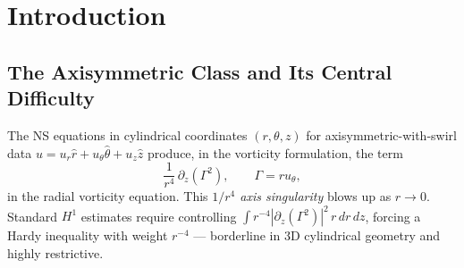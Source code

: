 \documentclass[11pt]{article}
\newcommand{\eps}{\varepsilon}
\begin{document}
\vspace{6pt}

\begin{abstract}
We study the 3D incompressible Navier--Stokes equations for
axisymmetric-with-swirl data. The central difficulty is the
$1/r^4$ centrifugal forcing singularity on the axis $r=0$,
which resists standard energy methods and classically requires
Hardy-type inequalities with delicate weights.

We introduce the \emph{Phi-Renormalization} (Definition~\ref{def:phi}): the substitution
$\Gamma = ru_\theta$, $\Phi = \Gamma/r^2 = u_\theta/r$
transforms the singular term via the algebraic identity
\[
  \frac{1}{r^4}\,\partial_z(\Gamma^2) = \partial_z(\Phi^2),
\]
canceling the $1/r^4$ singularity \emph{exactly and algebraically},
with no Hardy inequality and no approximation.

Two results follow: (I) global $C^\infty$ regularity for the
$Q_1$-augmented system at any $\eps>0$; (II) Gronwall-free convergence
$u^\eps\to u$ at rate $O(\eps^{4/(\beta+2)})$ via a multi-component
stability energy tracking vorticity direction, swirl, and axial vorticity
simultaneously.

\medskip
\noindent\textbf{Scope.} This note treats the axisymmetric-with-swirl class
and the $Q_1$-augmented approximation. It does \emph{not} claim unconditional
regularity for classical three-dimensional Navier--Stokes.
\end{abstract}

\section{Introduction}

\subsection{The Axisymmetric Class and Its Central Difficulty}

The NS equations in cylindrical coordinates $(r,\theta,z)$
for axisymmetric-with-swirl data
$u = u_r\hat{r}+u_\theta\hat{\theta}+u_z\hat{z}$ produce,
in the vorticity formulation, the term
\[
  \frac{1}{r^4}\,\partial_z(\Gamma^2), \qquad \Gamma = ru_\theta,
\]
in the radial vorticity equation.
This \emph{$1/r^4$ axis singularity} blows up as $r\to 0$.
Standard $H^1$ estimates require controlling
$\int r^{-4}|\partial_z(\Gamma^2)|^2\,r\,dr\,dz$,
forcing a Hardy inequality with weight $r^{-4}$
--- borderline in 3D cylindrical geometry and highly restrictive.
\end{document}
